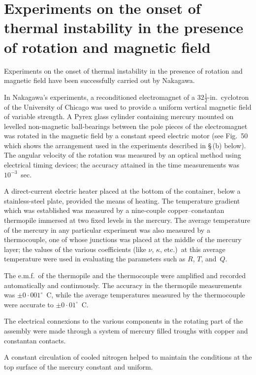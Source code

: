 \section{Experiments on the onset of thermal instability in the
presence of rotation and magnetic field}\label{sec:54}

Experiments on the onset of thermal instability in the presence of
rotation and magnetic field have been successfully carried out by
Nakagawa.

In Nakagawa's experiments, a reconditioned electromagnet of a $32\tfrac{1}{2}$-in.\
cyclotron of the University of Chicago was used to provide a uniform
vertical magnetic field of variable strength. A Pyrex glass cylinder
containing mercury mounted on levelled non-magnetic ball-bearings
between the pole pieces of the electromagnet was rotated in the magnetic
field by a constant speed electric motor (see Fig.~50 which shows the
arrangement used in the experiments described in \S\,(b) below). The
angular velocity of the rotation was measured by an optical method using
electrical timing devices; the accuracy attained in the time measurements was $10^{-3}$~sec.

A direct-current electric heater placed at the bottom of the container,
below a stainless-steel plate, provided the means of heating. The
temperature gradient which was established was measured by a nine-couple copper--constantan thermopile immersed at two fixed levels in
the mercury. The average temperature of the mercury in any particular
experiment was also measured by a thermocouple, one of whose junctions
was placed at the middle of the mercury layer; the values of the various
coefficients (like $\nu$, $\kappa$, etc.)\ at this average temperature were used in
evaluating the parameters such as $R$, $T$, and~$Q$.

The e.m.f.\ of the thermopile and the thermocouple were amplified
and recorded automatically and continuously. The accuracy in the
thermopile measurements was $\pm 0{\cdot}001^\circ$~C, while the average temperatures measured by the thermocouple were accurate to $\pm 0{\cdot}01^\circ$~C.

The electrical connexions to the various components in the rotating
part of the assembly were made through a system of mercury filled
troughs with copper and constantan contacts.

A constant circulation of cooled nitrogen helped to maintain the
conditions at the top surface of the mercury constant and uniform.

